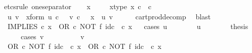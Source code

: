 \begin{isabellebody}
%
\isadelimproof
%
\endisadelimproof
%
\isatagproof
{}\isamarkupfalse%
{\isacharparenleft}{\kern0pt}etcs{\isacharunderscore}{\kern0pt}rule\ one{\isacharunderscore}{\kern0pt}separator{\isacharparenright}{\kern0pt}\isanewline
\ \ \isamarkupfalse%
\ x\ \isanewline
\ \ \isamarkupfalse%
\ x{\isacharunderscore}{\kern0pt}type{\isacharcolon}{\kern0pt}\ {\isachardoublequoteopen}x\ {\isasymin}\isactrlsub c\ {\isasymOmega}\ {\isasymtimes}\isactrlsub c\ {\isasymOmega}{\isachardoublequoteclose}\isanewline
\ \ \isamarkupfalse%
\ \isamarkupfalse%
\ u\ v\ \ x{\isacharunderscore}{\kern0pt}form{\isacharcolon}{\kern0pt}\ {\isachardoublequoteopen}u\ {\isasymin}\isactrlsub c\ {\isasymOmega}\ {\isasymand}\ v\ {\isasymin}\isactrlsub c\ {\isasymOmega}\ {\isasymand}\ x\ {\isacharequal}{\kern0pt}\ {\isasymlangle}u{\isacharcomma}{\kern0pt}\ v{\isasymrangle}{\isachardoublequoteclose}\isanewline
\ \ \ \ \isamarkupfalse%
\ cart{\isacharunderscore}{\kern0pt}prod{\isacharunderscore}{\kern0pt}decomp\ \isamarkupfalse%
\ blast\isanewline
\ \ \isamarkupfalse%
\ {\isachardoublequoteopen}IMPLIES\ {\isasymcirc}\isactrlsub c\ x\ {\isacharequal}{\kern0pt}\ {\isacharparenleft}{\kern0pt}OR\ {\isasymcirc}\isactrlsub c\ NOT\ {\isasymtimes}\isactrlsub f\ id\isactrlsub c\ {\isasymOmega}{\isacharparenright}{\kern0pt}\ {\isasymcirc}\isactrlsub c\ x{\isachardoublequoteclose}\isanewline
\ \ \isamarkupfalse%
{\isacharparenleft}{\kern0pt}cases\ {\isachardoublequoteopen}u\ {\isacharequal}{\kern0pt}\ {\isasymt}{\isachardoublequoteclose}{\isacharparenright}{\kern0pt}\isanewline
\ \ \ \ \isamarkupfalse%
\ {\isachardoublequoteopen}u\ {\isacharequal}{\kern0pt}\ {\isasymt}{\isachardoublequoteclose}\isanewline
\ \ \ \ \isamarkupfalse%
\ {\isacharquery}{\kern0pt}thesis\isanewline
\ \ \ \ \isamarkupfalse%
{\isacharparenleft}{\kern0pt}cases\ {\isachardoublequoteopen}v\ {\isacharequal}{\kern0pt}\ {\isasymt}{\isachardoublequoteclose}{\isacharparenright}{\kern0pt}\isanewline
\ \ \ \ \ \ \isamarkupfalse%
\ {\isachardoublequoteopen}v\ {\isacharequal}{\kern0pt}\ {\isasymt}{\isachardoublequoteclose}\isanewline
\ \ \ \ \ \ \isamarkupfalse%
\ {\isachardoublequoteopen}{\isacharparenleft}{\kern0pt}OR\ {\isasymcirc}\isactrlsub c\ NOT\ {\isasymtimes}\isactrlsub f\ id\isactrlsub c\ {\isasymOmega}{\isacharparenright}{\kern0pt}\ {\isasymcirc}\isactrlsub c\ x\ {\isacharequal}{\kern0pt}\ OR\ {\isasymcirc}\isactrlsub c\ {\isacharparenleft}{\kern0pt}NOT\ {\isasymtimes}\isactrlsub f\ id\isactrlsub c\ {\isasymOmega}{\isacharparenright}{\kern0pt}\ {\isasymcirc}\isactrlsub c\ x{\isachardoublequoteclose}\isanewline

\end{isabellebody}
